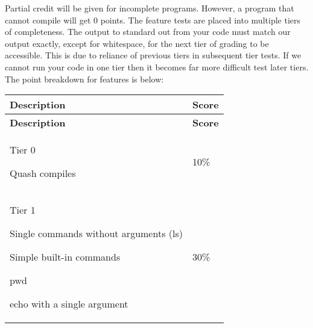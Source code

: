 Partial credit will be given for incomplete programs. However, a program that cannot compile will get 0 points. The feature tests are placed into multiple tiers of completeness. The output to standard out from your code must match our output exactly, except for whitespace, for the next tier of grading to be accessible. This is due to reliance of previous tiers in subsequent tier tests. If we cannot run your code in one tier then it becomes far more difficult test later tiers. The point breakdown for features is below\+:

\tabulinesep=1mm
\begin{longtabu} spread 0pt [c]{*{2}{|X[-1]}|}
\hline
\rowcolor{\tableheadbgcolor}\textbf{ Description  }&\textbf{ Score   }\\
\endfirsthead
\hline
\endfoot
\hline
\rowcolor{\tableheadbgcolor}\textbf{ Description  }&\textbf{ Score   }\\
\endhead

\begin{DoxyItemize}
\item Tier 0  
\begin{DoxyItemize}
\item Quash compiles  
\end{DoxyItemize}
\end{DoxyItemize}&10\%   \\

\begin{DoxyItemize}
\item Tier 1  
\begin{DoxyItemize}
\item Single commands without arguments (ls)  
\item Simple built-\/in commands  
\begin{DoxyItemize}
\item pwd  
\item echo with a single argument  
\end{DoxyItemize}
\end{DoxyItemize}
\end{DoxyItemize}&30\%   \\


\end{longtabu}
